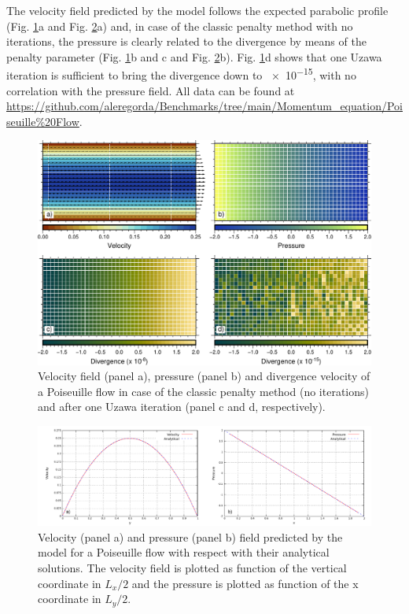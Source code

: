 \documentclass[hidelinks,10pt,a4paper]{article}
\begin{document}
The velocity field predicted by the model follows the expected parabolic profile (Fig. \ref{fig:poiseuille}a and Fig. \ref{fig:poi_plot}a) and, in case of the
classic penalty method with no iterations, the pressure is clearly related to the divergence by means of the penalty parameter (Fig. \ref{fig:poiseuille}b and
c and Fig. \ref{fig:poi_plot}b). Fig. \ref{fig:poiseuille}d shows that one Uzawa iteration is sufficient to bring the divergence down to \num{e-15}, with no
correlation with the pressure field. All data can be found at \url{https://github.com/aleregorda/Benchmarks/tree/main/Momentum_equation/Poiseuille%20Flow}.

\begin{figure}
\noindent\includegraphics[width=\textwidth]{./Figures/Poiseuille.pdf}
\caption{Velocity field (panel a), pressure (panel b) and divergence velocity of a Poiseuille flow in case of the classic penalty method (no iterations) and
after one Uzawa iteration (panel c and d, respectively).}
\label{fig:poiseuille}
\end{figure}

\begin{figure}
\noindent\includegraphics[width=\textwidth]{./Figures/Analytical.pdf}
\caption{Velocity (panel a) and pressure (panel b) field predicted by the model for a Poiseuille flow with respect with their analytical solutions. The
velocity field is plotted as function of the vertical coordinate in $L_x/2$ and the pressure is plotted as function of the x coordinate in $L_y/2$.}
\label{fig:poi_plot}
\end{figure}
\end{document}
